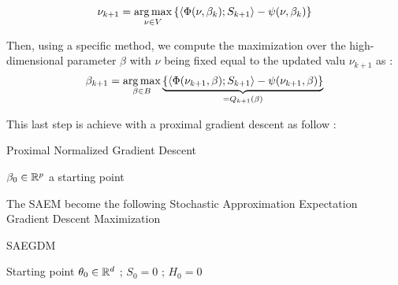 \documentclass[a4paper]{article}
\begin{document}
\begin{myText}
    $$\nu_{k+1} = \operatorname*{arg\,max}_{\nu\in V}\left\{\left\langle \Phi(\nu,\beta_k) ; S_{k+1}\right\rangle - \psi(\nu, \beta_k) \right\}$$ 

Then, using a specific method, we compute the maximization over the high-dimensional parameter $\beta$ with $\nu$ being fixed equal to the updated valu $\nu_{k+1}$ as : 
    $$\beta_{k+1} = \operatorname*{arg\,max}_{\beta\in B}\underbrace{\left\{\left\langle \Phi(\nu_{k+1},\beta) ; S_{k+1}\right\rangle - \psi(\nu_{k+1}, \beta)\right\}}_{=Q_{k+1}(\beta)} $$

This last step is achieve with a proximal gradient descent as follow : 

\begin{myAlgorithm}[12cm]
    \caption{Proximal Normalized Gradient Descent}\label{PNGD}
    \Initialize $\beta_0 \in \mathbb R^p$ a starting point
    
\end{myAlgorithm}

The SAEM become the following Stochastic Approximation Expectation Gradient Descent Maximization 


\begin{myAlgorithm}[13cm]
    \caption{SAEGDM }
    \Initialize Starting point $\theta_0 \in \mathbb R^d$ ; $S_0 = 0$ ; $H_0 = 0$
    
\end{myAlgorithm}


\end{myText}
\end{document}
